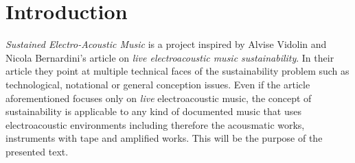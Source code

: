 \documentclass[twoside,a4paper]{article}
\title{\papertitle}
\begin{document}
\maketitle


\begin{abstract}

The musical composition is close to a point break: almost one hundred years ago Ottorino Respighi introduced a recorded media into his orchestral composition \emph{I Pini di Roma} and even today we don't have a shared consolidate electroacoustic practice to play it likewise the orchestral one. Someone does it better than others, by its own equilibrium between knowledge and consciousness. After all, it is only a recorded bird sound to be placed inside an orchestra, not a virtuoso part to be played on a handmade custom electroacoustic instrument disappeared from the earth except by memories and score notes. The problem is more serious and deep if consider most of today's electroacoustic-manipulators don't know who Respighi was and what happened after him. Something must change to introduce a way that conducts a practice consolidation on electroacoustic literature.

\end{abstract}


\section{Introduction}
\label{sec:intro}

\emph{Sustained Electro-Acoustic Music} is a project inspired by Alvise Vidolin and Nicola Bernardini's article on \emph{live electroacoustic music sustainability}. In their article they point at multiple technical faces of the sustainability problem such as technological, notational or general conception issues. Even if the article aforementioned focuses only on \emph{live} electroacoustic music, the concept of sustainability is applicable to any kind of documented music that uses electroacoustic environments including therefore the acousmatic works, instruments with tape and amplified works. This will be the purpose of the presented text.
\end{document}
